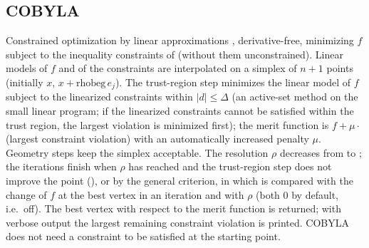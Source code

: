 \subsection{COBYLA}

Constrained optimization by linear approximations \cite{optimize:powell1994,optimize:powell1998}, derivative-free, minimizing $f$
subject to the inequality constraints of  (without them unconstrained). Linear models of $f$ and of the
constraints are interpolated on a simplex of $n+1$ points (initially $x$, $x+\mathrm{rhobeg}\,e_j$). The trust-region step
minimizes the linear model of $f$ subject to the linearized constraints within $|d|\le\Delta$ (an active-set method on the small
linear program; if the linearized constraints cannot be satisfied within the trust region, the largest violation is minimized
first); the merit function is $f+\mu\cdot$(largest constraint violation) with an automatically increased penalty $\mu$. Geometry
steps keep the simplex acceptable. The resolution $\rho$ decreases from  to ; the iterations
finish when $\rho$ has reached  and the trust-region step does not improve the point (), or
by the general criterion, in which  is compared with the change of $f$ at the best vertex in an iteration and
 with $\rho$ (both 0 by default, i.e.\ off). The best vertex with respect to the merit function is returned;
with verbose output the largest remaining constraint violation is printed. COBYLA does not need a constraint to be satisfied at
the starting point.

\begin{lareference}
\end{lareference}

